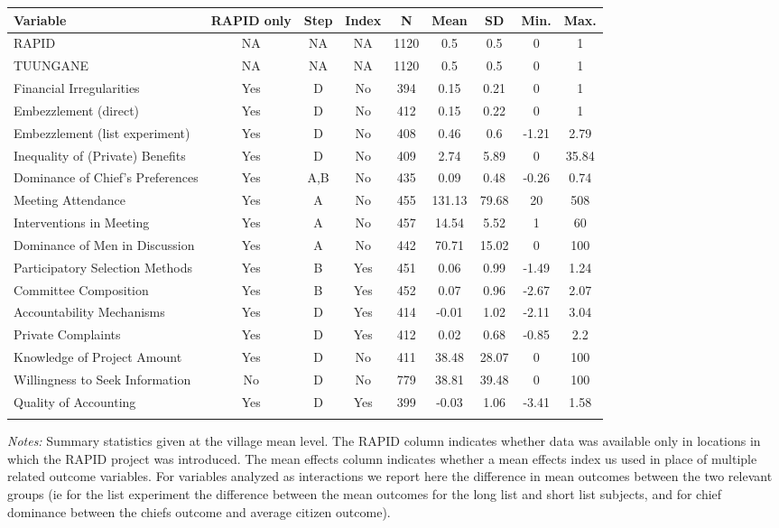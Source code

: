\begin{tabular}{lcccccccc}  
 	Variable &	RAPID only &  Step & Index & N	&	Mean	&	SD	&	Min. & Max.	 \\ \hline \hline  
 RAPID&NA&NA&NA&1120&0.5&0.5&0&1 \\  
 TUUNGANE&NA&NA&NA&1120&0.5&0.5&0&1 \\  
 Financial Irregularities&Yes&D&No&394&0.15&0.21&0&1 \\  
 Embezzlement (direct)&Yes&D&No&412&0.15&0.22&0&1 \\  
 Embezzlement (list experiment)&Yes&D&No&408&0.46&0.6&-1.21&2.79 \\  
 Inequality of (Private) Benefits&Yes&D&No&409&2.74&5.89&0&35.84 \\  
 Dominance of Chief's Preferences&Yes&A,B&No&435&0.09&0.48&-0.26&0.74 \\  
 Meeting Attendance&Yes&A&No&455&131.13&79.68&20&508 \\  
 Interventions in Meeting&Yes&A&No&457&14.54&5.52&1&60 \\  
 Dominance of Men in Discussion&Yes&A&No&442&70.71&15.02&0&100 \\  
 Participatory Selection Methods&Yes&B&Yes&451&0.06&0.99&-1.49&1.24 \\  
 Committee Composition&Yes&B&Yes&452&0.07&0.96&-2.67&2.07 \\  
 Accountability Mechanisms&Yes&D&Yes&414&-0.01&1.02&-2.11&3.04 \\  
 Private Complaints&Yes&D&Yes&412&0.02&0.68&-0.85&2.2 \\  
 Knowledge of Project Amount&Yes&D&No&411&38.48&28.07&0&100 \\  
 Willingness to Seek Information&No&D&No&779&38.81&39.48&0&100 \\  
 Quality of Accounting&Yes&D&Yes&399&-0.03&1.06&-3.41&1.58 \\  
 \hline \hline  
 \label{table_ss}  
 \end{tabular}  
 \begin{flushleft}\textit{Notes:} Summary statistics given at the village mean level. The RAPID column indicates whether data was available only in locations in which the RAPID project was introduced. The mean effects column indicates whether a mean effects index us used in place of multiple related outcome variables. 
For variables analyzed as interactions we report here the difference in mean outcomes between the two relevant groups (ie for the list
experiment the difference between the mean outcomes for the long list and short list subjects, and for chief dominance between the chiefs outcome and average citizen outcome).\end{flushleft}  
